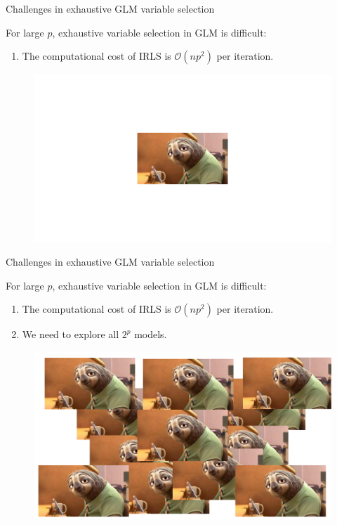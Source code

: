 \documentclass[12pt,aspectratio=169]{beamer}
\begin{document}
\begin{frame}{Challenges in exhaustive GLM variable selection}

For large $ p $, exhaustive variable selection in GLM is difficult:
	\begin{enumerate}

\item The computational cost of IRLS is $ \mathcal{O}(np^2) $ per iteration.

\end{enumerate}
\begin{figure}
	\centering
	\includegraphics[width=0.7\linewidth]{sloth_one}
\end{figure}
\end{frame}







\begin{frame}{Challenges in exhaustive GLM variable selection}

For large $ p $, exhaustive variable selection in GLM is difficult:
	\begin{enumerate}

\item The computational cost of IRLS is $ \mathcal{O}(np^2) $ per iteration.

\item We need to explore all $ 2^p $ models.
\end{enumerate}
\begin{figure}
	\centering
	\includegraphics[width=0.7\linewidth]{sloth_multiple}
\end{figure}
\end{frame}
\end{document}
